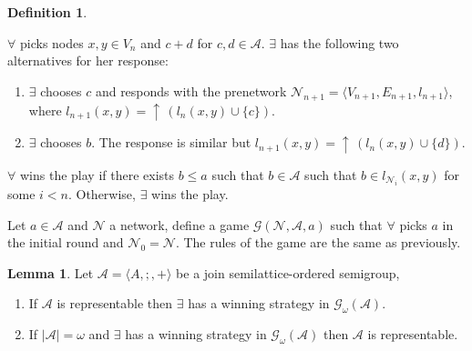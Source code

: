 \documentclass[a4paper]{article}
\theoremstyle{definition}
\newtheorem{definition}{Definition}
\theoremstyle{theorem}
\theoremstyle{proposition}
\theoremstyle{lemma}
\newtheorem{lemma}{Lemma}
\theoremstyle{ex}
\theoremstyle{corollary}
\theoremstyle{claim}
\newcommand{\up}[1]{\ensuremath{{\uparrow}\,#1}}
\begin{document}
\begin{definition}
\begin{enumerate}
\begin{enumerate}
      $\forall$ picks nodes $x, y \in V_n$ and $c + d$ for $c, d \in \mathcal{A}$. $\exists$ has the following two alternatives for her response:
      \begin{enumerate}
        \item $\exists$ chooses $c$ and responds with the prenetwork $\mathcal{N}_{n + 1} = \langle V_{n + 1}, E_{n + 1}, l_{n + 1} \rangle$, where $l_{n+1}(x, y) = \up{(l_n(x,y) \cup \{ c \})}$.
        \item $\exists$ chooses $b$. The response is similar but $l_{n + 1}(x, y) = \up{(l_n(x,y) \cup \{ d \})}$.
      \end{enumerate}
    \end{enumerate}
  \end{enumerate}

  $\forall$ wins the play if there exists $b \leq a$ such that $b \in \mathcal{A}$ such that $b \in l_{\mathcal{N}_i}(x,y)$ for some $i < n$. Otherwise, $\exists$ wins the play.

  Let $a \in \mathcal{A}$ and $\mathcal{N}$ a network, define a game $\mathcal{G}(\mathcal{N}, \mathcal{A}, a)$ such that $\forall$ picks $a$ in the initial round and $\mathcal{N}_0 = \mathcal{N}$. The rules of the game are the same as previously.
\end{definition}

\begin{lemma} \label{rep} Let $\mathcal{A} = \langle A, ;, + \rangle$ be a join semilattice-ordered semigroup,

  \begin{enumerate}
    \item If $\mathcal{A}$ is representable then $\exists$ has a winning strategy in $\mathcal{G}_{\omega}(\mathcal{A})$.
    \item If $|\mathcal{A}| = \omega$ and $\exists$ has a winning strategy in $\mathcal{G}_{\omega}(\mathcal{A})$ then $\mathcal{A}$ is representable.
  \end{enumerate}
\end{lemma}
\end{document}
